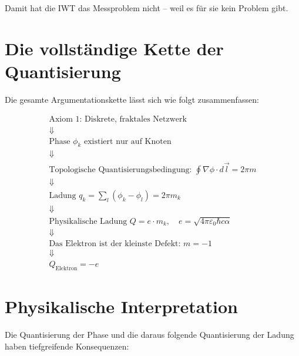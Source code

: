 Damit hat die IWT das Messproblem nicht – weil es für sie kein Problem gibt.

\section{Die vollständige Kette der Quantisierung}
\label{app:phasenquantisierung_kette}

Die gesamte Argumentationskette lässt sich wie folgt zusammenfassen:

\[
\boxed{
\begin{array}{c}
\text{Axiom 1: Diskrete, fraktales Netzwerk} \\
\Downarrow \\
\text{Phase } \phi_k \text{ existiert nur auf Knoten} \\
\Downarrow \\
\text{Topologische Quantisierungsbedingung: } \oint \nabla \phi \cdot d\vec{l} = 2\pi m \\
\Downarrow \\
\text{Ladung } q_k = \sum_l (\phi_k - \phi_l) = 2\pi m_k \\
\Downarrow \\
\text{Physikalische Ladung } Q = e \cdot m_k, \quad e = \sqrt{4\pi\varepsilon_0 \hbar c \alpha} \\
\Downarrow \\
\text{Das Elektron ist der kleinste Defekt: } m = -1 \\
\Downarrow \\
\boxed{Q_{\text{Elektron}} = -e}
\end{array}
}
\]

\section{Physikalische Interpretation}
\label{app:phasenquantisierung_interpretation}

Die Quantisierung der Phase und die daraus folgende Quantisierung der Ladung haben tiefgreifende Konsequenzen:

